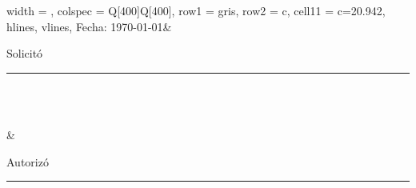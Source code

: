 \documentclass[letterpaper,9pt]{article}
\begin{document}
\begin{table}[h]
	\centering
	\begin{tblr}{
			width = \linewidth,
			colspec = {Q[400]Q[400]},
			row{1} = {gris},
			row{2} = {c},
			cell{1}{1} = {c=2}{0.942\linewidth},
			hlines,
			vlines,
		}
		Fecha: \today                      &                                                                                                       \\
		{Solicitó\\[1cm] \rule{6cm}{0.5mm}\\\NOMBRE\\\PUESTO} & {Autorizó\\[1cm] \rule{6cm}{0.5mm}\\\NOMBREJEFE\\\PUESTOJEFE} 
	\end{tblr}
\end{table}
\end{document}
